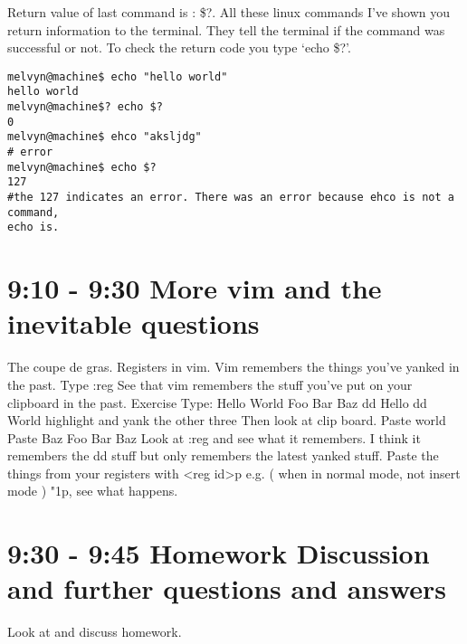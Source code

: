 \documentclass[10pt]{article}
\begin{document}
Return value of last command is : \$?. All these linux commands I've shown you
return information to the terminal. They tell the terminal if the command was
successful or not. To check the return code you type `echo \$?'.

\begin{lstlisting}[style=term]
melvyn@machine$ echo "hello world"
hello world 
melvyn@machine$? echo $?
0
melvyn@machine$ ehco "aksljdg"
# error
melvyn@machine$ echo $?
127
#the 127 indicates an error. There was an error because ehco is not a command,
echo is.
\end{lstlisting}

\section{ 9:10 - 9:30 More vim and the inevitable questions }
The coupe de gras. Registers in vim. Vim remembers the things you've yanked in the past. Type :reg
See that vim remembers the stuff you've put on your clipboard in the past.
Exercise
Type:
Hello
World
Foo
Bar
Baz
dd Hello
dd World
highlight and yank the other three
Then look at clip board.
Paste world
Paste Baz
Foo
Bar
Baz
Look at :reg and see what it remembers. I think it remembers the dd stuff but only remembers the latest yanked stuff.
Paste the things from your registers with <reg id>p e.g. ( when  in normal mode, not insert mode ) "1p, see what happens. 


\section*{ 9:30 - 9:45 Homework Discussion and further questions and answers }
Look at and discuss homework.
\end{document}
